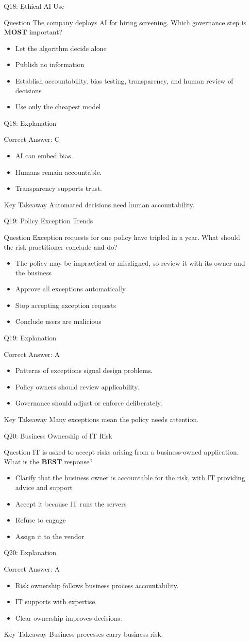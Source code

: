\documentclass[aspectratio=169]{beamer}
\newcommand{\hq}[7]{%
	\begin{frame}{Q#1: #2}
		\begin{block}{Question}
			#3
		\end{block}
		\begin{itemize}
			#4
		\end{itemize}
	\end{frame}
	\begin{frame}{Q#1: Explanation}
		\begin{block}{Correct Answer: #5}
			\begin{itemize}
				#6
			\end{itemize}
		\end{block}
		\begin{alertblock}{Key Takeaway}
			#7
		\end{alertblock}
	\end{frame}
}
\begin{document}
	\hq{18}{Ethical AI Use}
	{The company deploys AI for hiring screening. Which governance step is \textbf{MOST} important?}
	{\item[\textbf{(A)}] Let the algorithm decide alone
		\item[\textbf{(B)}] Publish no information
		\item[\textbf{(C)}] Establish accountability, bias testing, transparency, and human review of decisions
		\item[\textbf{(D)}] Use only the cheapest model}
	{C}
	{\item AI can embed bias.
		\item Humans remain accountable.
		\item Transparency supports trust.}
	{Automated decisions need human accountability.}
	
	\hq{19}{Policy Exception Trends}
	{Exception requests for one policy have tripled in a year. What should the risk practitioner conclude and do?}
	{\item[\textbf{(A)}] The policy may be impractical or misaligned, so review it with its owner and the business
		\item[\textbf{(B)}] Approve all exceptions automatically
		\item[\textbf{(C)}] Stop accepting exception requests
		\item[\textbf{(D)}] Conclude users are malicious}
	{A}
	{\item Patterns of exceptions signal design problems.
		\item Policy owners should review applicability.
		\item Governance should adjust or enforce deliberately.}
	{Many exceptions mean the policy needs attention.}
	
	\hq{20}{Business Ownership of IT Risk}
	{IT is asked to accept risks arising from a business-owned application. What is the \textbf{BEST} response?}
	{\item[\textbf{(A)}] Clarify that the business owner is accountable for the risk, with IT providing advice and support
		\item[\textbf{(B)}] Accept it because IT runs the servers
		\item[\textbf{(C)}] Refuse to engage
		\item[\textbf{(D)}] Assign it to the vendor}
	{A}
	{\item Risk ownership follows business process accountability.
		\item IT supports with expertise.
		\item Clear ownership improves decisions.}
	{Business processes carry business risk.}
	
\end{document}
